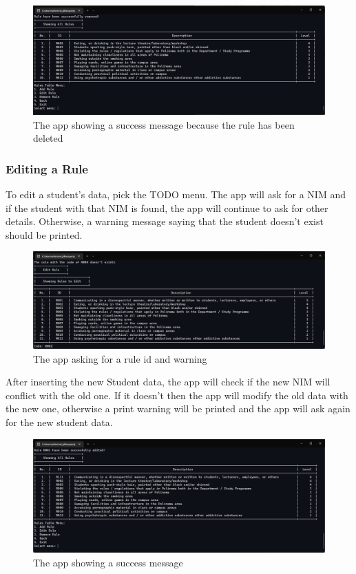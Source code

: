 \documentclass[12pt,titlepage]{article}
\begin{document}
\begin{figure}[h]
    \centering
    \includegraphics[width=.8\textwidth]{images/remove-rule-success.png}
    \caption{The app showing a success message because the rule has been deleted}
\end{figure}

\pagebreak

\subsubsection{Editing a Rule}
To edit a student's data, pick the TODO menu. The app will ask for a NIM and if the student with that NIM is found,
the app will continue to ask for other details. Otherwise, a warning message saying that the student doesn't exist should be printed.

\begin{figure}[h]
    \centering
    \includegraphics[width=.8\textwidth]{images/edit-rule-input.png}
    \caption{The app asking for a rule id and warning}
\end{figure}

After inserting the new Student data, the app will check if the new NIM will conflict with the old one.
If it doesn't then the app will modify the old data with the new one, otherwise a print warning will be printed
and the app will ask again for the new student data.

\begin{figure}[h]
    \centering
    \includegraphics[width=.8\textwidth]{images/edit-rule-success.png}
    \caption{The app showing a success message}
\end{figure}
\end{document}
